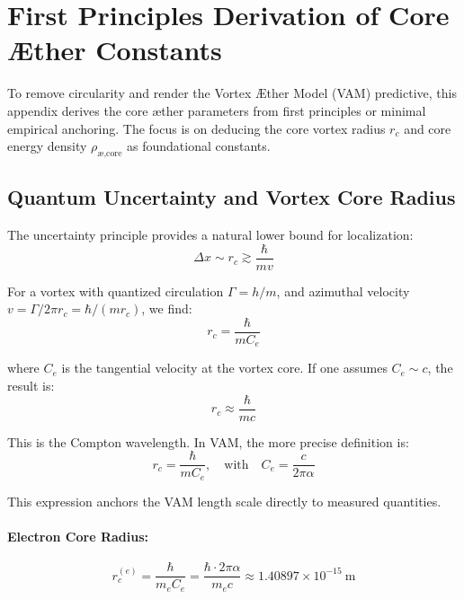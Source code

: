 \section{First Principles Derivation of Core \AE{}ther Constants}

        To remove circularity and render the Vortex \AE{}ther Model (VAM) predictive, this appendix derives the core \ae{}ther parameters from first principles or minimal empirical anchoring. The focus is on deducing the core vortex radius $r_c$ and core energy density $\rho_{\text{\ae,core}}$ as foundational constants.

        \subsection{ Quantum Uncertainty and Vortex Core Radius}

        The uncertainty principle provides a natural lower bound for localization:
        \begin{equation}
        \Delta x \sim r_c \gtrsim \frac{\hbar}{m v}
        \end{equation}

        For a vortex with quantized circulation $\Gamma = h/m$, and azimuthal velocity $v = \Gamma / 2\pi r_c = \hbar / (m r_c)$, we find:
        \begin{equation}
        r_c = \frac{\hbar}{m C_e}
        \end{equation}

        where $C_e$ is the tangential velocity at the vortex core. If one assumes $C_e \sim c$, the result is:
        \begin{equation}
        r_c \approx \frac{\hbar}{m c}
        \end{equation}

        This is the Compton wavelength. In VAM, the more precise definition is:
        \begin{equation}
        r_c = \frac{\hbar}{m C_e}, \quad \text{with} \quad C_e = \frac{c}{2\pi \alpha}
        \end{equation}

        This expression anchors the VAM length scale directly to measured quantities.

        \paragraph{Electron Core Radius:}
        \begin{equation}
        r_c^{(e)} = \frac{\hbar}{m_e C_e} = \frac{\hbar \cdot 2\pi \alpha}{m_e c} \approx 1.40897 \times 10^{-15} \ \text{m}
        \end{equation}


